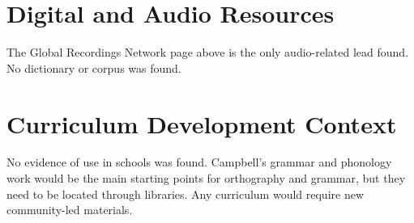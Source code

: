 \documentclass[12pt]{article}
\begin{document}
\section{Digital and Audio Resources}
The Global Recordings Network page above is the only audio-related lead found. No dictionary or corpus was found.

\section{Curriculum Development Context}
No evidence of use in schools was found. Campbell's grammar and phonology work would be the main starting points for orthography and grammar, but they need to be located through libraries. Any curriculum would require new community-led materials.
\end{document}
